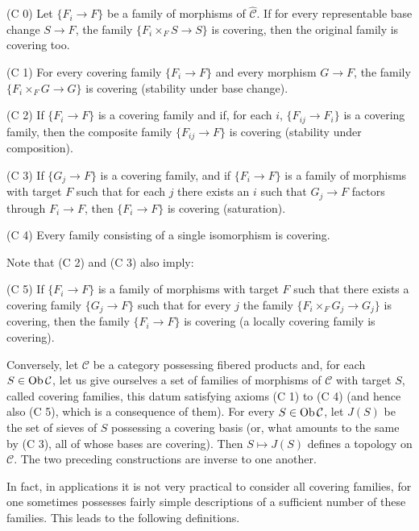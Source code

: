 \setcounter{footnote}{21}
\renewcommand{\thefootnote}{(\arabic{footnote})}

\noindent
(C 0) Let \(\{F_i\to F\}\) be a family of morphisms of \(\widehat{\mathcal C}\).
If for every representable base change \(S\to F\), the family
\(\{F_i\times_F S\to S\}\) is covering, then the original family is covering too.

(C 1) For every covering family \(\{F_i\to F\}\) and every morphism \(G\to F\),
the family \(\{F_i\times_F G\to G\}\) is covering (\og stability under base change\fg).

(C 2) If \(\{F_i\to F\}\) is a covering family and if, for each \(i\),
\(\{F_{ij}\to F_i\}\) is a covering family, then the composite family
\(\{F_{ij}\to F\}\) is covering (\og stability under composition\fg).

(C 3) If \(\{G_j\to F\}\) is a covering family, and if \(\{F_i\to F\}\)
is a family of morphisms with target \(F\) such that for each \(j\) there exists an
\(i\) such that \(G_j\to F\) factors through \(F_i\to F\), then
\(\{F_i\to F\}\) is covering (\og saturation\fg).

(C 4) Every family consisting of a single isomorphism is covering.

Note that (C 2) and (C 3) also imply:

(C 5) If \(\{F_i\to F\}\) is a family of morphisms with target \(F\) such that
there exists a covering family \(\{G_j\to F\}\) such that for every \(j\)
the family \(\{F_i\times_F G_j\to G_j\}\) is covering, then the family
\(\{F_i\to F\}\) is covering (\og a locally covering family is covering\fg).

\label{IV.4.2.4}
Conversely, let \(\mathcal C\) be a category possessing fibered products and,
for each \(S\in\operatorname{Ob}\mathcal C\), let us give ourselves a set of families of
morphisms of \(\mathcal C\) with target \(S\), called covering families,
this datum satisfying axioms (C 1) to (C 4) (and hence also (C 5), which is
a consequence of them). For every \(S\in\operatorname{Ob}\mathcal C\), let \(J(S)\) be
the set of sieves of \(S\) possessing a covering basis (or, what amounts to
the same by (C 3), all of whose bases are covering). Then \(S\mapsto J(S)\)
defines a topology on \(\mathcal C\). The two preceding constructions are
inverse to one another.

In fact, in applications it is not very practical to consider all covering
families, for one sometimes possesses fairly simple descriptions of a
\og sufficient\fg{} number of these families. This leads to the following definitions.

